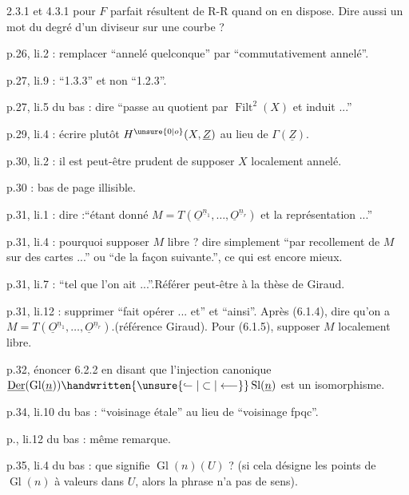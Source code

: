 2.3.1 et 4.3.1 pour $F$ parfait résultent de R-R quand on en dispose. Dire aussi un mot du degré d'un diviseur sur une courbe ?

p.26, li.2 :  remplacer ``annelé quelconque'' par ``commutativement annelé''.

p.27, li.9 : ``1.3.3'' et non ``1.2.3''.

p.27, li.5 du bas : dire ``passe au quotient par $\operatorname{Filt}^{2}(X)$ et induit ...''

p.29, li.4 : écrire plutôt $H^{\unsure{0|o}}(X,\underline{Z})$  au lieu de $\Gamma(\underline{Z})$.


p.30, li.2 : il est peut-être prudent de supposer $X$ localement annelé.

p.30 : bas de page illisible.

p.31, li.1 : dire :``étant donné $M=T(\underline{O}^{\underline{n}_1},\ldots,\underline{O}^{\underline{n}_r})$ et la représentation ...''

p.31, li.4 : pourquoi supposer $M$ libre ? dire simplement ``par recollement de $M$ sur des cartes ...'' ou ``de la façon suivante.'', ce qui est  encore mieux.

p.31, li.7 : ``tel que l'on ait ...''.Référer peut-être à la thèse de Giraud.

p.31, li.12 : supprimer ``fait opérer ... et'' et ``ainsi''. Après (6.1.4), dire qu'on  a $M=T(\underline{O}^{\underline{n}_1},\ldots,\underline{O}^{\underline{n}_r})$.(référence Giraud). Pour (6.1.5), supposer $M$ localement libre.

p.32,  énoncer 6.2.2 en disant que l'injection canonique $\underline{\operatorname{Der}}(\operatorname{Gl}(\underline{n}))\handwritten{\unsure{\lhook\joinrel\relbar|\subset|\longleftarrow}}\operatorname{Sl}(\underline{n})$ est un isomorphisme. 

p.34, li.10 du bas : ``voisinage étale'' au lieu de ``voisinage fpqc''.

p., li.12 du bas : même remarque.

p.35, li.4 du bas : que signifie $\operatorname{Gl}(n)(U)$ ? (si cela désigne les points de $\operatorname{Gl}(n)$ à valeurs dans $U$, alors la phrase n'a pas de sens).

